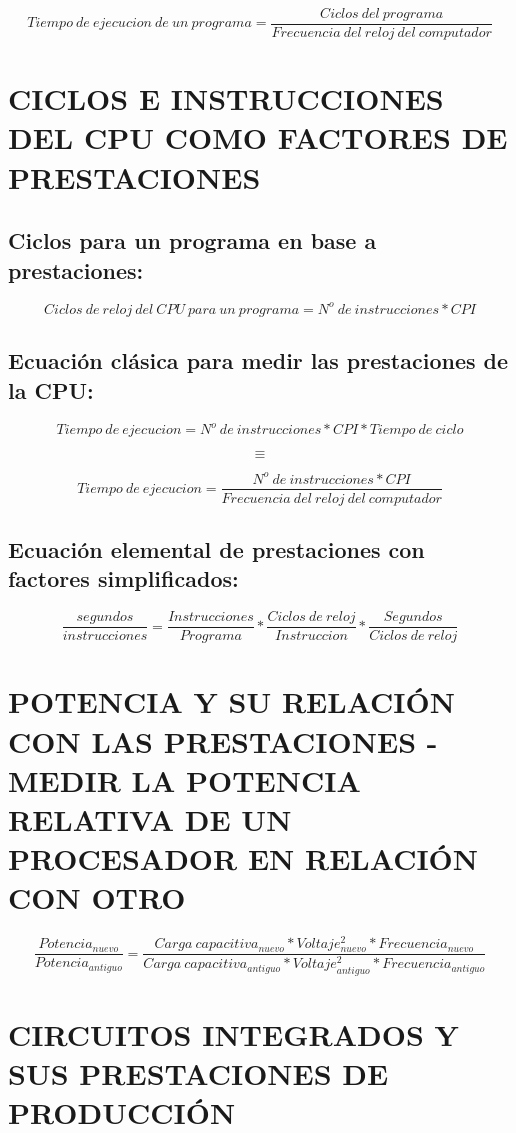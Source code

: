 \documentclass{article}
\begin{document}
$$Tiempo\ de\ ejecucion\ de\ un\ programa = \frac{Ciclos\ del\ programa}{Frecuencia\ del\ reloj\ del\ computador}$$

\section{ \uppercase{Ciclos e instrucciones del CPU como factores de prestaciones} }

\subsection{Ciclos para un programa en base a prestaciones:}

$$Ciclos\ de\ reloj\ del\ CPU\ para\ un\ programa = N^o\ de\ instrucciones * CPI$$


\subsection{Ecuación clásica para medir las prestaciones de la CPU:}

$$Tiempo\ de\ ejecucion = {N^o\ de\ instrucciones} * {CPI} * {Tiempo\ de\ ciclo}$$

$$\equiv$$

$$Tiempo\ de\ ejecucion = \frac{N^o\ de\ instrucciones * CPI}{Frecuencia\ del\ reloj\ del\ computador}$$


\subsection{Ecuación elemental de prestaciones con factores simplificados:}

$$\frac{segundos}{instrucciones} = \frac{Instrucciones}{Programa} * \frac{Ciclos\ de\ reloj}{Instruccion} * \frac{Segundos}{Ciclos\ de\ reloj}$$

\section{ \uppercase{Potencia y su relación con las prestaciones - medir la potencia relativa de un procesador en relación con otro} }

$$\frac{Potencia_{nuevo}}{Potencia_{antiguo}} = \frac{Carga\ capacitiva_{nuevo} * Voltaje^2_{nuevo} * Frecuencia_{nuevo}}{Carga\ capacitiva_{antiguo} * Voltaje^2_{antiguo} * Frecuencia_{antiguo}}$$


\section{ \uppercase{Circuitos integrados y sus prestaciones de producción} }
\end{document}
